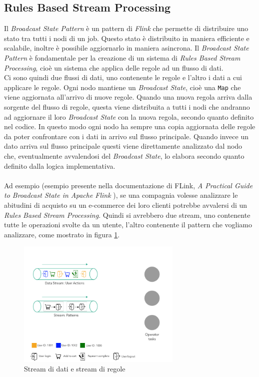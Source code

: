 \subsection{Rules Based Stream Processing}
\label{subsec:RulesBasedStreamProcessing}
Il \textit{Broadcast State Pattern} è un pattern di \textit{Flink} che permette di distribuire uno stato tra tutti i nodi di un job.
Questo stato è distribuito in maniera efficiente e scalabile, inoltre è possibile aggiornarlo in maniera asincrona.
Il \textit{Broadcast State Pattern} è fondamentale per la creazione di un sistema di \textit{Rules Based Stream Processing}, 
cioè un sistema che applica delle regole ad un flusso di dati.\\
Ci sono quindi due flussi di dati, uno contenente le regole e l'altro i dati a cui applicare le regole.
Ogni nodo mantiene un \textit{Broadcast State}, cioè una \texttt{Map} che viene aggiornata all'arrivo di nuove regole.
Quando una nuova regola arriva dalla sorgente del flusso di regole, questa viene distribuita a tutti i nodi che andranno ad aggiornare il loro \textit{Broadcast State}
con la nuova regola, secondo quanto definito nel codice. In questo modo ogni nodo ha sempre una copia aggiornata delle regole da poter confrontare con i dati in arrivo sul flusso principale.
Quando invece un dato arriva sul flusso principale questi viene direttamente analizzato dal nodo che, eventualmente avvalendosi del \textit{Broadcast State}, lo elabora 
secondo quanto definito dalla logica implementativa.\\\\
Ad esempio (esempio presente nella documentazione di FLink, \textit{A Practical Guide to Broadcast State in Apache Flink} \cite{broadcastStatePatternGuide}),
se una compagnia volesse analizzare le abitudini di acquisto su un e-commerce dei loro clienti 
potrebbe avvalersi di un \textit{Rules Based Stream Processing}. Quindi si avrebbero due stream, uno contenente tutte le operazioni svolte da un utente,
l'altro contenente il pattern che vogliamo analizzare, come mostrato in figura \ref{fig:broadcastState1}.
\begin{figure}[htpb]
    \centering
    \includegraphics[width=0.7\textwidth]{images/EventExport/broadcastState1.png}
    \caption{Stream di dati e stream di regole}
    \label{fig:broadcastState1}
\end{figure}
